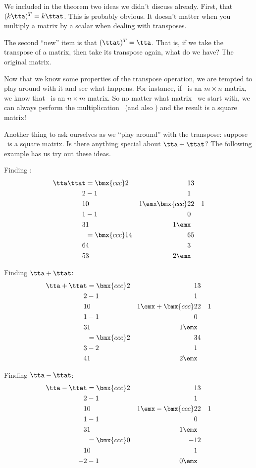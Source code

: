 \smallskip

We included in the theorem two ideas we didn't discuss already. First, that $(k\tta)^T = k\ttat$. This is probably obvious. It doesn't matter when you multiply a matrix by a scalar when dealing with transposes.

The second ``new'' item is that $(\ttat)^T = \tta$. That is, if we take the transpose of a matrix, then take its transpose again, what do we have? The original matrix.

Now that we know some properties of the transpose operation, we are tempted to play around with it and see what happens. For instance, if \tta\ is an $m\times n$ matrix, we know that \ttat\ is an $n\times m$ matrix. So no matter what matrix \tta\ we start with, we can always perform the multiplication \tta\ttat\ (and also \ttat\tta) and the result is a square matrix! 

Another thing to ask ourselves as we ``play around'' with the transpose: suppose \tta\ is a square matrix. Is there anything special about $\tta+\ttat$? The following example has us try out these ideas.\\

\medskip

{Finding \tta\ttat:
\begin{align*}
	\tta\ttat &= \bmx{ccc}2&1&3\\2&-1&1\\1&0&1\emx\bmx{ccc}2&2&1\\1&-1&0\\3&1&1\emx \\					
						&= \bmx{ccc}14 & 6 & 5\\ 6&4&3\\ 5& 3& 2\emx
\end{align*}

Finding $\tta+\ttat$:
\begin{align*}
	\tta+\ttat 	&= \bmx{ccc}2&1&3\\2&-1&1\\1&0&1\emx+\bmx{ccc}2&2&1\\1&-1&0\\3&1&1\emx\\
							&= \bmx{ccc}2&3&4\\3&-2&1\\4&1&2\emx
\end{align*}

Finding $\tta-\ttat$:
\begin{align*}
	\tta-\ttat 	&=	\bmx{ccc}2&1&3\\2&-1&1\\1&0&1\emx-\bmx{ccc}2&2&1\\1&-1&0\\3&1&1\emx\\
						&=	\bmx{ccc} 0&-1&2\\1&0&1\\-2&-1&0\emx
\end{align*}
\ } 

